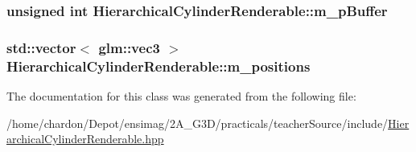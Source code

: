 \hypertarget{classHierarchicalCylinderRenderable_a7a69b3845a3dd2259b3c23a7c339232b}{
\subsubsection[{m\+\_\+p\+Buffer}]{\setlength{\rightskip}{0pt plus 5cm}unsigned int Hierarchical\+Cylinder\+Renderable\+::m\+\_\+p\+Buffer\hspace{0.3cm}{\ttfamily [private]}}}\label{classHierarchicalCylinderRenderable_a7a69b3845a3dd2259b3c23a7c339232b}
\hypertarget{classHierarchicalCylinderRenderable_aa25417073ea90df6ea59d7d87050df49}{
\subsubsection[{m\+\_\+positions}]{\setlength{\rightskip}{0pt plus 5cm}std\+::vector$<$ glm\+::vec3 $>$ Hierarchical\+Cylinder\+Renderable\+::m\+\_\+positions\hspace{0.3cm}{\ttfamily [private]}}}\label{classHierarchicalCylinderRenderable_aa25417073ea90df6ea59d7d87050df49}


The documentation for this class was generated from the following file\+:\begin{DoxyCompactItemize}
\item 
/home/chardon/\+Depot/ensimag/2\+A\+\_\+\+G3\+D/practicals/teacher\+Source/include/\hyperlink{HierarchicalCylinderRenderable_8hpp}{Hierarchical\+Cylinder\+Renderable.\+hpp}\end{DoxyCompactItemize}
